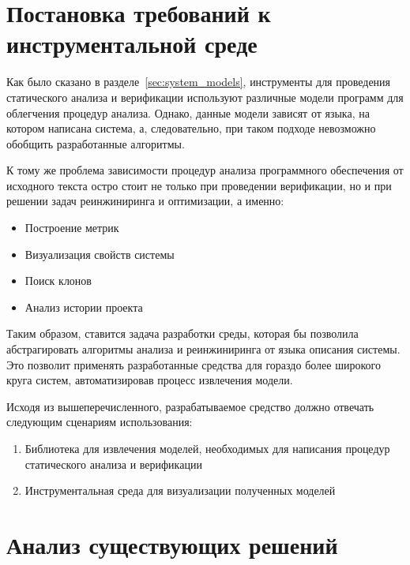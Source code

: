 \section{Постановка требований к инструментальной среде}
\label{sec:requirements}

Как было сказано в разделе~\ref{sec:system_models}, инструменты для проведения
статического анализа и верификации используют различные модели программ для
облегчения процедур анализа. Однако, данные модели зависят от языка, на котором
написана система, а, следовательно, при таком подходе невозможно обобщить
разработанные алгоритмы.

К тому же проблема зависимости процедур анализа программного обеспечения от
исходного текста остро стоит не только при проведении верификации, но и при
решении задач реинжиниринга и оптимизации, а именно:

\begin{itemize}
    \item Построение метрик
    \item Визуализация свойств системы
    \item Поиск клонов
    \item Анализ истории проекта
\end{itemize}

Таким образом, ставится задача разработки среды, которая бы позволила
абстрагировать алгоритмы анализа и реинжиниринга от языка описания системы. Это
позволит применять разработанные средства для гораздо более широкого круга
систем, автоматизировав процесс извлечения модели.

Исходя из вышеперечисленного, разрабатываемое средство должно отвечать
следующим сценариям использования:

\begin{enumerate}
    \item Библиотека для извлечения моделей, необходимых для написания процедур
    статического анализа и верификации
    \item Инструментальная среда для визуализации полученных моделей
\end{enumerate}

\section{Анализ существующих решений}

